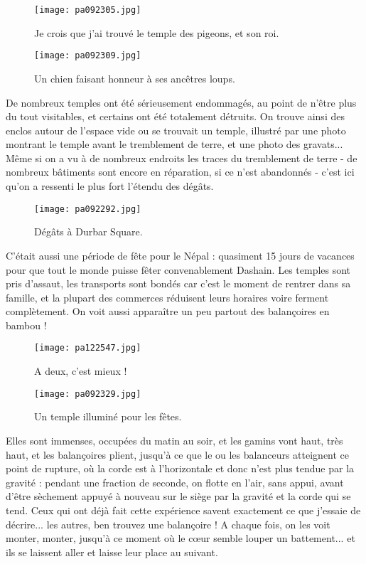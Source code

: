 \documentclass{book}
\begin{document}
\begin{figure}[h]
\centering
\texttt{[image: pa092305.jpg]}
\caption*{Je crois que j'ai trouvé le temple des pigeons, et son roi.}
\end{figure}


\begin{figure}[h]
\centering
\texttt{[image: pa092309.jpg]}
\caption*{Un chien faisant honneur à ses ancêtres loups.}
\end{figure}

De nombreux temples ont été sérieusement endommagés, au point de n'être plus du tout visitables, et certains ont été totalement détruits. On trouve ainsi des enclos autour de l'espace vide ou se trouvait un temple, illustré par une photo montrant le temple avant le tremblement de terre, et une photo des gravats... Même si on a vu à de nombreux endroits les traces du tremblement de terre - de nombreux bâtiments sont encore en réparation, si ce n'est abandonnés - c'est ici qu'on a ressenti le plus fort l'étendu des dégâts.


\begin{figure}[h]
\centering
\texttt{[image: pa092292.jpg]}
\caption*{Dégâts à Durbar Square.}
\end{figure}

C'était aussi une période de fête pour le Népal : quasiment 15 jours de vacances pour que tout le monde puisse fêter convenablement Dashain. Les temples sont pris d'assaut, les transports sont bondés car c'est le moment de rentrer dans sa famille, et la plupart des commerces réduisent leurs horaires voire ferment complètement. On voit aussi apparaître un peu partout des balançoires en bambou !


\begin{figure}[h]
\centering
\texttt{[image: pa122547.jpg]}
\caption*{A deux, c'est mieux !}
\end{figure}


\begin{figure}[h]
\centering
\texttt{[image: pa092329.jpg]}
\caption*{Un temple illuminé pour les fêtes.}
\end{figure}

Elles sont immenses, occupées du matin au soir, et les gamins vont haut, très haut, et les balançoires plient, jusqu'à ce que le ou les balanceurs atteignent ce point de rupture, où la corde est à l'horizontale et donc n'est plus tendue par la gravité : pendant une fraction de seconde, on flotte en l'air, sans appui, avant d'être sèchement appuyé à nouveau sur le siège par la gravité et la corde qui se tend. Ceux qui ont déjà fait cette expérience savent exactement ce que j'essaie de décrire... les autres, ben trouvez une balançoire ! A chaque fois, on les voit monter, monter, jusqu'à ce moment où le cœur semble louper un battement... et ils se laissent aller et laisse leur place au suivant.
\end{document}
